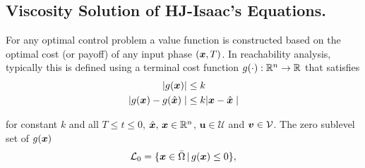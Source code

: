 \subsection{Viscosity Solution of HJ-Isaac's Equations.}
\label{subsec:visc}

\noindent  
For any optimal control problem a value function is constructed based on the optimal cost (or payoff) of any input phase $(\bm{x}, T)$.  In reachability analysis, typically this is defined using a terminal cost function $g(\cdot): \mathbb{R}^n \rightarrow \mathbb{R}$ that satisfies 
\begin{subequations}
	\begin{align}
		| g(\bm{x}) | &\le k \\
		| g(\bm{x}) - g(\hat{\bm{x}}) \mid &\le k | \bm{x} - \hat{\bm{x}} \mid
	\end{align}
\end{subequations}

for constant $k$ and all 
$T \le t \le 0$, $\hat{\bm{x}}, \, \bm{x} \in \mathbb{R}^n$, $\bm{u}\in \mathcal{U}$ and $\bm{v} \in \mathcal{V}$.  The zero sublevel set of $g(\bm{x})$ \ie
%
\begin{align}
	\mathcal{L}_0 = \{ \state \in \bar{\Omega} \,|\, g(\state) \le 0 \},
	\label{eq:target_set_syk}
\end{align}

